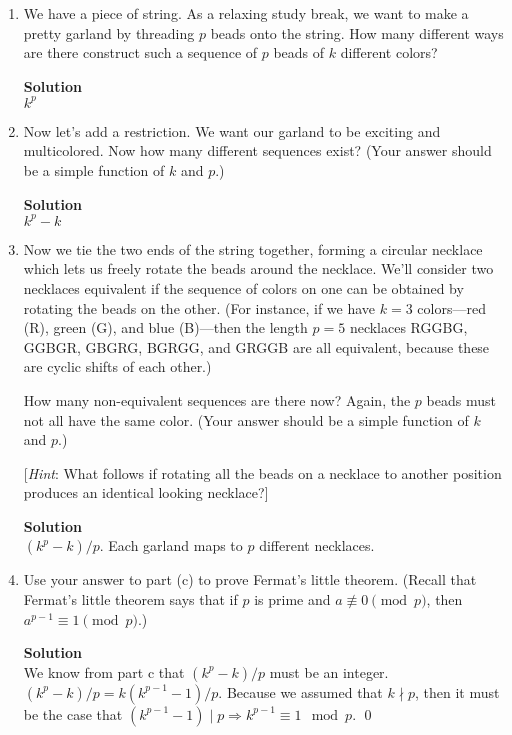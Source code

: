 \documentclass[11pt]{article}
\newenvironment{Parts}{\begin{enumerate}[label=(\alph*)]}{\end{enumerate}}
\newcommand*{\Part}{\item}
\begin{document}
  \begin{Parts}

    \Part We have a piece of string. As a relaxing study break, we want to make a
    pretty garland by threading $p$ beads onto the string.
    How many different ways are there construct such a sequence of $p$ beads of $k$ different colors?
\begin{mdframed} \textbf{Solution} \\
$k^p$
\end{mdframed}

    \Part Now let's add a restriction.  We want our garland to be exciting and multicolored. Now
    how many different sequences exist?
    (Your answer should be a simple function of $k$ and $p$.)
\begin{mdframed} \textbf{Solution} \\
$k^p-k$
\end{mdframed}

    \Part Now we tie the two ends of the string together, forming a circular
    necklace which lets us freely rotate the beads around the necklace.
    We'll consider two necklaces equivalent if the sequence of colors on one
    can be obtained by rotating the beads on the other.
    (For instance, if we have $k=3$ colors---red (R), green (G), and
    blue (B)---then the length $p = 5$ necklaces RGGBG, GGBGR, GBGRG, BGRGG, and GRGGB are all
    equivalent, because these are cyclic shifts of each other.)

    How many non-equivalent sequences are there now? Again, the $p$
    beads must not all have the same color.
    (Your answer should be a simple function of $k$ and $p$.)

    [\textit{Hint}: What follows if rotating all the beads on a necklace to another
      position produces an identical looking necklace?]
\begin{mdframed} \textbf{Solution} \\
$(k^p-k)/p$. Each garland maps to $p$ different necklaces. 
\end{mdframed}

    \Part Use your answer to part (c) to prove Fermat's little theorem.
    (Recall that Fermat's little theorem says that if $p$ is prime and
    $a \not\equiv 0 \pmod p$, then $a^{p-1} \equiv 1 \pmod p$.)
\begin{mdframed} \textbf{Solution} \\
We know from part c that $(k^p-k)/p$ must be an integer. $(k^p-k)/p=k(k^{p-1}-1)/p$. Because we assumed that $k \nmid p$, then it must be the case that $(k^{p-1}-1) \mid p \Rightarrow k^{p-1} \equiv 1 \mod p$. \qed
\end{mdframed}

    \end{Parts}

\end{document}
